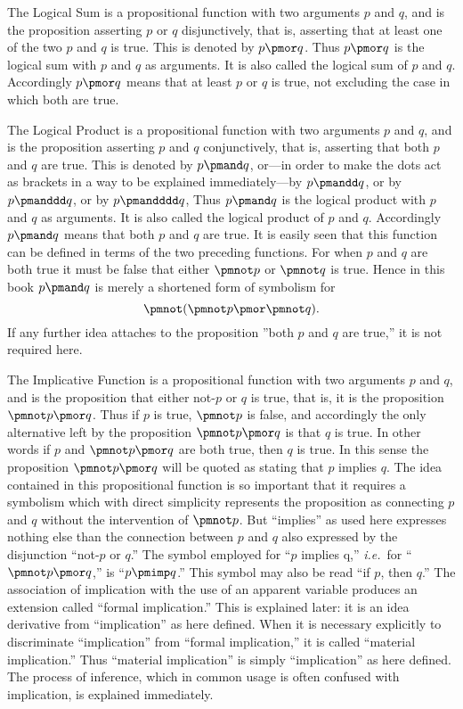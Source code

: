 \documentclass[letterpaper,12pt,openany,leqno]{book}
\newcommand{\pagefirst}[1]{\marginnote[\boxed{\text{#1}}]{\boxed{\text{#1}}}}
\begin{document}
The Logical Sum is a propositional function with two arguments $p$ and $q$, and is the proposition asserting $p$ or $q$ disjunctively, that is, asserting that at least one of the two $p$ and $q$ is true. This is denoted by $p \pmor q$. Thus $p \pmor q$ is the logical sum with $p$ and $q$ as arguments. It is also called the logical sum of $p$ and $q$. Accordingly $p \pmor q$ means that at least $p$ or $q$ is true, not excluding the case in which both are true.

The Logical Product is a propositional function with two arguments $p$ and $q$, and is the proposition asserting $p$ and $q$ conjunctively, that is, asserting that both $p$ and $q$ are true. This is denoted by $p \pmand q$, or---in order to make the dots act as brackets in a way to be explained immediately---by $p \pmandd q$, or by $p \pmanddd q$, or by $p \pmandddd q$, Thus $p \pmand q$ is the logical product with \pagefirst{7} $p$ and $q$ as arguments. It is also called the logical product of $p$ and $q$. Accordingly $p \pmand q$ means that both $p$ and $q$ are true. It is easily seen that this function can be defined in terms of the two preceding functions. For when $p$ and $q$ are both true it must be false that either $\pmnot p$ or $\pmnot q$ is true. Hence in this book $p \pmand q$ is merely a shortened form of symbolism for
\[ 
\pmnot (\pmnot p \pmor \pmnot q).
\]
If any further idea attaches to the proposition ''both $p$ and $q$ are true,''
it is not required here.

The Implicative Function is a propositional function with two arguments $p$ and $q$, and is the proposition that either not-$p$ or $q$ is true, that is, it is the proposition $\pmnot p \pmor q$. Thus if $p$ is true, $\pmnot p$ is false, and accordingly the only alternative left by the proposition $\pmnot p \pmor q$ is that $q$ is true. In other words if $p$ and $\pmnot p \pmor q$ are both true, then $q$ is true. In this sense the proposition $\pmnot p \pmor q$ will be quoted as stating that $p$ implies $q$. The idea contained in this propositional function is so important that it requires a symbolism which with direct simplicity represents the proposition as connecting $p$ and $q$ without the intervention of $\pmnot p$. But ``implies'' as used here expresses nothing else than the connection between $p$ and $q$ also expressed by the disjunction ``not-$p$ or $q$.'' The symbol employed for ``$p$ implies q,'' \textit{i.e.}\ for ``$\pmnot p \pmor q$,'' is ``$p \pmimp q$.'' This symbol may also be read ``if $p$, then $q$.'' The association of implication with the use of an apparent variable produces an extension called ``formal implication.'' This is explained later: it is an idea derivative from ``implication'' as here defined. When it is necessary explicitly to discriminate ``implication'' from ``formal implication,'' it is called ``material implication.'' Thus ``material implication'' is simply ``implication'' as here defined. The process of inference, which in common usage is often confused with implication, is explained immediately.
\end{document}
